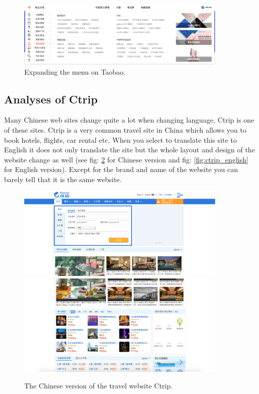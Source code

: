 \begin{figure}[h]
\centering
\includegraphics[width=100mm]{Images/Taobao_menu}
\decoRule
\caption[Taobao' menu bar]{Expanding the menu on Taobao.}
\label{fig:taobao_menu}
\end{figure}

\subsection{Analyses of Ctrip}
Many Chinese web sites change quite a lot when changing language. Ctrip is one of these sites. Ctrip is a very common travel site in China which allows you to book hotels, flights, car rental etc. When you select to translate this site to English it does not only translate the site but the whole layout and design of the website change as well (see  fig: \ref{fig:ctrip_chinese} for Chinese version and fig: \ref{fig:ctrip_english} for English version). Except for the brand and name of the website you can barely tell that it is the same website.
\begin{figure}[h]
\centering
\includegraphics[width=100mm]{Images/ctrip_chinese1}
\includegraphics[width=100mm]{Images/ctrip_chinese2}
\decoRule
\caption[Chinese version of Ctrip]{The Chinese version of the travel website Ctrip.}
\label{fig:ctrip_chinese}
\end{figure}

